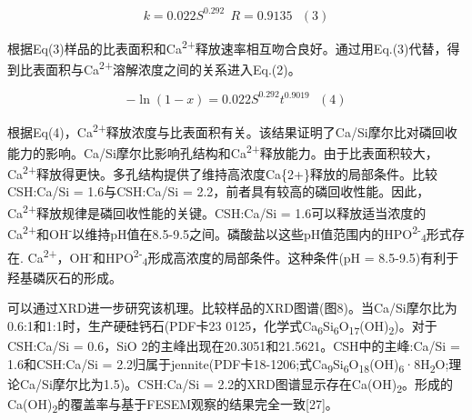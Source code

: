 \documentclass[11pt]{article}
\begin{document}
\[k = 0.022S^{0.292} \ \ R = 0.9135 \ \ \ (3)\]

\setlength{\parindent}{1.0cm}
根据Eq(3)样品的比表面积和Ca\textsuperscript{2+}释放速率相互吻合良好。通过用Eq.(3)代替，得到比表面积与Ca\textsuperscript{2+}溶解浓度之间的关系进入Eq.(2)。
\par

\[-\ln(1-x) = 0.022S^{0.292}t^{0.9019} \ \ \ (4)\]

\setlength{\parindent}{1.0cm}
根据Eq(4)，Ca\textsuperscript{2+}释放浓度与比表面积有关。该结果证明了Ca/Si摩尔比对磷回收能力的影响。Ca/Si摩尔比影响孔结构和Ca\textsuperscript{2+}释放能力。由于比表面积较大，Ca\textsuperscript{2+}释放得更快。多孔结构提供了维持高浓度Ca\{2+\}释放的局部条件。比较CSH:Ca/Si = 1.6与CSH:Ca/Si = 2.2，前者具有较高的磷回收性能。因此，Ca\textsuperscript{2+}释放规律是磷回收性能的关键。CSH:Ca/Si = 1.6可以释放适当浓度的Ca\textsuperscript{2+}和OH\textsuperscript{-}以维持pH值在8.5-9.5之间。磷酸盐以这些pH值范围内的HPO\textsuperscript{2-}\textsubscript{4}形式存在.\cite{liu12_remov_high_concen_phosp_by_calcit} Ca\textsuperscript{2+}，OH\textsuperscript{-}和HPO\textsuperscript{2-}\textsubscript{4}形成高浓度的局部条件。这种条件(pH = 8.5-9.5)有利于羟基磷灰石的形成。
\par

\setlength{\parindent}{1.0cm}
可以通过XRD进一步研究该机理。比较样品的XRD图谱(图8)。当Ca/Si摩尔比为0.6:1和1:1时，生产硬硅钙石(PDF卡23 0125，化学式Ca\textsubscript{6}Si\textsubscript{6}O\textsubscript{17}(OH)\textsubscript{2})。对于CSH:Ca/Si = 0.6，SiO 2的主峰出现在20.3051和21.5621。CSH中的主峰:Ca/Si = 1.6和CSH:Ca/Si = 2.2归属于jennite(PDF卡18-1206;式Ca\textsubscript{9}Si\textsubscript{6}O\textsubscript{18}(OH)\textsubscript{6}·8H\textsubscript{2}O;理论Ca/Si摩尔比为1.5)。CSH:Ca/Si = 2.2的XRD图谱显示存在Ca(OH)\textsubscript{2}。形成的Ca(OH)\textsubscript{2}的覆盖率与基于FESEM观察的结果完全一致[27]。
\par
\end{document}
